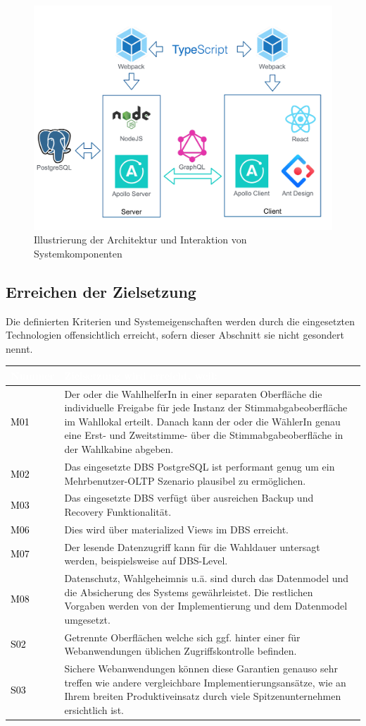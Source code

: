 \documentclass[a4paper,12pt]{article}
\newcommand\addrow[2]{\textcolor{black}{#1} &#2\\ \hline}
\newcommand\addheading[2]{\rowcolor{TUMBlue}\textcolor{white}{#1} & \textcolor{white}{#2}\\ \hline}
\newcommand\tabularhead{\begin{tabular}{|b|p{13cm}|}
\hline
}
\newenvironment{usecase}{\tabularhead}
{\hline\end{tabular}}
\begin{document}
\begin{figure}[h!]
      \centering
      \includegraphics[width=\textwidth]{architecture.pdf}
      \caption{Illustrierung der Architektur und Interaktion von Systemkomponenten}
      \label{fig:architecture}
\end{figure}

\clearpage

\subsection{Erreichen der Zielsetzung}
Die definierten Kriterien und Systemeigenschaften werden durch die eingesetzten Technologien 
offensichtlich erreicht, sofern dieser Abschnitt sie nicht gesondert nennt.

\begin{usecase}
	\addheading{Nummer}{Zielsetzung wird erreicht, weil:} 
      \addrow{M01}{Der oder die WahlhelferIn in einer separaten Oberfläche die individuelle Freigabe für jede Instanz der Stimmabgabeoberfläche im Wahllokal erteilt. Danach kann der oder die WählerIn genau eine Erst- und Zweitstimme- über die Stimmabgabeoberfläche in der Wahlkabine abgeben.}
      \addrow{M02}{Das eingesetzte DBS PostgreSQL ist performant genug um ein Mehrbenutzer-OLTP Szenario plausibel zu ermöglichen.}
      \addrow{M03}{Das eingesetzte DBS verfügt über ausreichen Backup und Recovery Funktionalität.}
	\addrow{M06}{Dies wird über materialized Views im DBS erreicht.}
	\addrow{M07}{Der lesende Datenzugriff kann für die Wahldauer untersagt werden, beispielsweise auf DBS-Level.}
      \addrow{M08}{Datenschutz, Wahlgeheimnis u.ä. sind durch das Datenmodel und die Absicherung des Systems gewährleistet. Die restlichen Vorgaben werden von der Implementierung und dem Datenmodel umgesetzt.}
      \addrow{S02}{Getrennte Oberflächen welche sich ggf. hinter einer für Webanwendungen üblichen Zugriffskontrolle befinden.}
      \addrow{S03}{Sichere Webanwendungen können diese Garantien genauso sehr treffen wie andere vergleichbare Implementierungsansätze, wie an Ihrem breiten Produktiveinsatz durch viele Spitzenunternehmen ersichtlich ist.}
\end{usecase}
\end{document}
